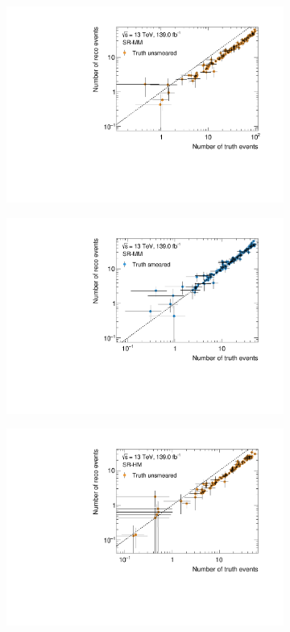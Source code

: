 \begin{figure}
\begin{subfigure}[b]{0.49\linewidth}
	\end{subfigure}\hfill
	\begin{subfigure}[b]{0.49\linewidth}
		\centering\includegraphics[width=\textwidth]{yields_SR-MM_unsmeared}
	\end{subfigure}\hfill
	\begin{subfigure}[b]{0.49\linewidth}
		\centering\includegraphics[width=\textwidth]{yields_SR-MM_smeared}
	\end{subfigure}\hfill
	\begin{subfigure}[b]{0.49\linewidth}
		\centering\includegraphics[width=\textwidth]{yields_SR-HM_unsmeared}

\end{subfigure}
\end{figure}
